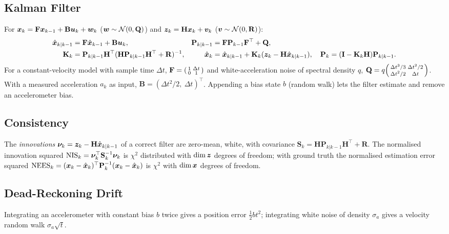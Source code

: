 \documentclass[11pt,a4paper]{article}
\begin{document}
\subsection{Kalman Filter}
For $\bm{x}_k=\mathbf F\bm{x}_{k-1}+\mathbf B\bm{u}_k+\bm{w}_k$ ($\bm{w}\sim\mathcal N(0,\mathbf Q)$) and $\bm{z}_k=\mathbf H\bm{x}_k+\bm{v}_k$ ($\bm{v}\sim\mathcal N(0,\mathbf R)$):
\begin{align}
  \hat{\bm{x}}_{k|k-1}&=\mathbf F\hat{\bm{x}}_{k-1}+\mathbf B\bm{u}_k, & \mathbf P_{k|k-1}&=\mathbf F\mathbf P_{k-1}\mathbf F^\top+\mathbf Q,\notag\\
  \mathbf K_k&=\mathbf P_{k|k-1}\mathbf H^\top(\mathbf H\mathbf P_{k|k-1}\mathbf H^\top+\mathbf R)^{-1}, &
  \hat{\bm{x}}_k&=\hat{\bm{x}}_{k|k-1}+\mathbf K_k(\bm{z}_k-\mathbf H\hat{\bm{x}}_{k|k-1}),\quad \mathbf P_k=(\mathbf I-\mathbf K_k\mathbf H)\mathbf P_{k|k-1}.
  \label{eq:kf}
\end{align}
For a constant-velocity model with sample time $\Delta t$, $\mathbf F=\begin{psmallmatrix}1&\Delta t\\0&1\end{psmallmatrix}$ and white-acceleration noise of spectral density $q$, $\mathbf Q=q\begin{psmallmatrix}\Delta t^3/3&\Delta t^2/2\\\Delta t^2/2&\Delta t\end{psmallmatrix}$. With a measured acceleration $a_k$ as input, $\mathbf B=(\Delta t^2/2,\ \Delta t)^\top$. Appending a bias state $b$ (random walk) lets the filter estimate and remove an accelerometer bias.

\subsection{Consistency}
The \emph{innovations} $\bm{\nu}_k=\bm{z}_k-\mathbf H\hat{\bm{x}}_{k|k-1}$ of a correct filter are zero-mean, white, with covariance $\mathbf S_k=\mathbf H\mathbf P_{k|k-1}\mathbf H^\top+\mathbf R$. The normalised innovation squared $\mathrm{NIS}_k=\bm{\nu}_k^\top\mathbf S_k^{-1}\bm{\nu}_k$ is $\chi^2$ distributed with $\dim\bm{z}$ degrees of freedom; with ground truth the normalised estimation error squared $\mathrm{NEES}_k=(\bm{x}_k-\hat{\bm{x}}_k)^\top\mathbf P_k^{-1}(\bm{x}_k-\hat{\bm{x}}_k)$ is $\chi^2$ with $\dim\bm{x}$ degrees of freedom.

\subsection{Dead-Reckoning Drift}
Integrating an accelerometer with constant bias $b$ twice gives a position error $\tfrac12bt^2$; integrating white noise of density $\sigma_a$ gives a velocity random walk $\sigma_a\sqrt t$.
\end{document}
